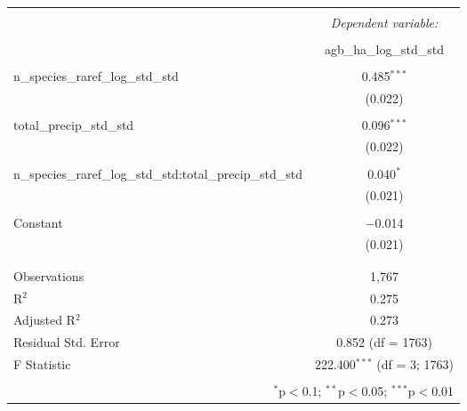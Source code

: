 
\begin{table}[!htbp] \centering 
  \caption{} 
  \label{mois_div_int_mod} 
\begin{tabular}{@{\extracolsep{5pt}}lc} 
\\[-1.8ex]\hline 
\hline \\[-1.8ex] 
 & \multicolumn{1}{c}{\textit{Dependent variable:}} \\ 
\cline{2-2} 
\\[-1.8ex] & agb\_ha\_log\_std\_std \\ 
\hline \\[-1.8ex] 
 n\_species\_raref\_log\_std\_std & 0.485$^{***}$ \\ 
  & (0.022) \\ 
  & \\ 
 total\_precip\_std\_std & 0.096$^{***}$ \\ 
  & (0.022) \\ 
  & \\ 
 n\_species\_raref\_log\_std\_std:total\_precip\_std\_std & 0.040$^{*}$ \\ 
  & (0.021) \\ 
  & \\ 
 Constant & $-$0.014 \\ 
  & (0.021) \\ 
  & \\ 
\hline \\[-1.8ex] 
Observations & 1,767 \\ 
R$^{2}$ & 0.275 \\ 
Adjusted R$^{2}$ & 0.273 \\ 
Residual Std. Error & 0.852 (df = 1763) \\ 
F Statistic & 222.400$^{***}$ (df = 3; 1763) \\ 
\hline 
\hline \\[-1.8ex] 
\multicolumn{2}{r}{$^{*}$p$<$0.1; $^{**}$p$<$0.05; $^{***}$p$<$0.01} \\ 
\end{tabular} 
\end{table} 
